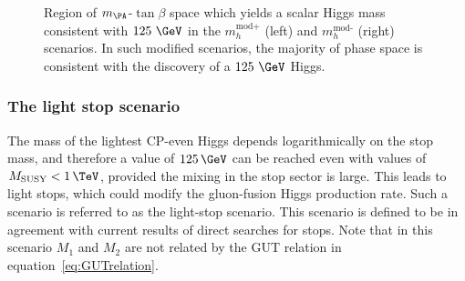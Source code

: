 \begin{figure}[htbp]
\caption[Region of $m_{\PA}$-$\tan\beta$ space which yields a scalar Higgs mass 
consistent with $125~\GeV$ in the $m_{h}^{\text{mod}}$ scenarios.]
{Region of $m_{\PA}$-$\tan\beta$ space which yields a scalar Higgs mass 
consistent with $125~\GeV$ in the $m_{h}^{\text{mod+}}$ (left) and
$m_{h}^{\text{mod-}}$ (right) scenarios. In such modified scenarios, the
majority of phase space is consistent with the discovery of a $125~\GeV$ Higgs.}
\label{fig:mhmodmass}
\end{figure}

\subsubsection{The light stop scenario}
\label{sec:lightstopscenario}

The mass of the lightest CP-even Higgs depends logarithmically on the stop mass,
and therefore a value of $125\,\GeV$ can be reached even with values of
$M_{\text{SUSY}} < 1\,\TeV$, provided the mixing in the stop sector is large. This
leads to light stops, which could modify the gluon-fusion Higgs production rate.
Such a scenario is referred to as the light-stop scenario. This scenario is
defined to be in agreement with current results of direct searches for stops.
Note that in this scenario $M_{1}$ and $M_{2}$ are not related by the GUT
relation in equation~\ref{eq:GUTrelation}. 

